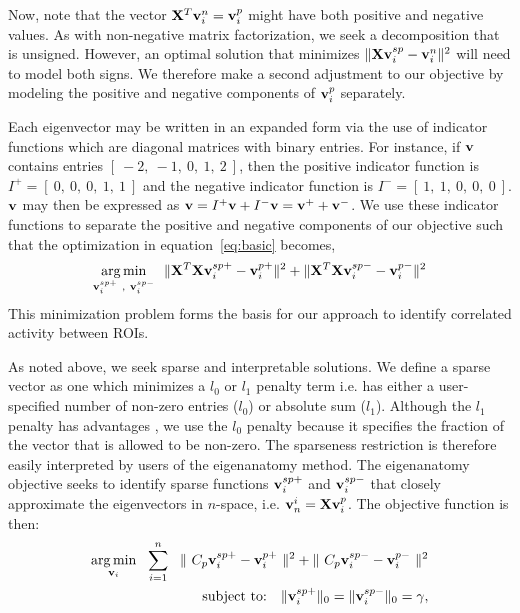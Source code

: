 \documentclass{llncs}
\newcommand{\X}{{\bf X}}
\newcommand{\vv}{{\bf v}}
\begin{document}
Now, note that the vector $\X^T\vv_i^n=\vv_i^p$ might have both positive and negative values.  As with non-negative matrix factorization, we seek a decomposition that is unsigned.   However, an optimal solution that minimizes $\|  \X \vv^{sp}_i - \vv_i^n \|^2$ will need to model both signs.  We therefore make a second adjustment to our objective by modeling the positive and negative components of $\vv_i^p$ separately.

Each eigenvector may be written in an expanded form via the use of indicator functions which are diagonal matrices with binary entries.  For instance, if $\vv$ contains entries $[~-2,~-1,~0,~1,~2~]$, then the positive indicator function is $I^+=[~0,~0,~0,~1,~1~]$ and the negative indicator function is $I^-=[~1,~1,~0,~0,~0~]$.  $\vv$ may then be expressed as $\vv = I^+\vv + I^- \vv = \vv^+ + \vv^-$.  We use these indicator functions to separate the positive and negative components of our objective such that the optimization in equation~\ref{eq:basic} becomes,
\begin{equation}
\label{eq:basic2}
\underset{\vv^{sp+}_i~,~\vv^{sp-}_i}{\operatorname{arg\,min}}~~\|  \X^T\X \vv^{sp+}_i - \vv_i^{p+} \|^2 + \|  \X^T\X \vv^{sp-}_i - \vv_i^{p-} \|^2  
\end{equation}
This minimization problem forms the basis for our approach to identify correlated activity between ROIs.

As noted above, we seek sparse and interpretable solutions.  We define a sparse vector as one which minimizes a $l_0$ or $l_1$ penalty term i.e. has either a user-specified number of non-zero entries ($l_0$) or absolute sum ($l_1$).  Although the $l_1$ penalty has advantages \cite{sparsePCA_zou},  we use the $l_0$ penalty because it specifies the fraction of the vector that is allowed to be non-zero.  The sparseness restriction is therefore easily interpreted by users of the eigenanatomy method.  The eigenanatomy objective seeks to identify sparse functions $\vv_i^{sp+}$ and $\vv_i^{sp-}$ that closely approximate the eigenvectors in $n$-space, i.e. $\vv^i_n=\X \vv_i^p$.  The objective function is then:
\begin{eqnarray}
\label{eq:eigenanatomy}
\underset{\vv_i}{\operatorname{arg\,min}}~~\sum^n_{i=1}~~\|~C_p \vv_i^{sp+} - \vv_i^{p+} ~\|^2 + \|~C_p \vv_i^{sp-} - \vv_i^{p-} ~\|^2 \\ 
\text{subject to:}~~~  \| \vv_i^{sp+} \|_0 =  \| \vv_i^{sp-} \|_0 = \gamma,\notag
\end{eqnarray}
\end{document}
